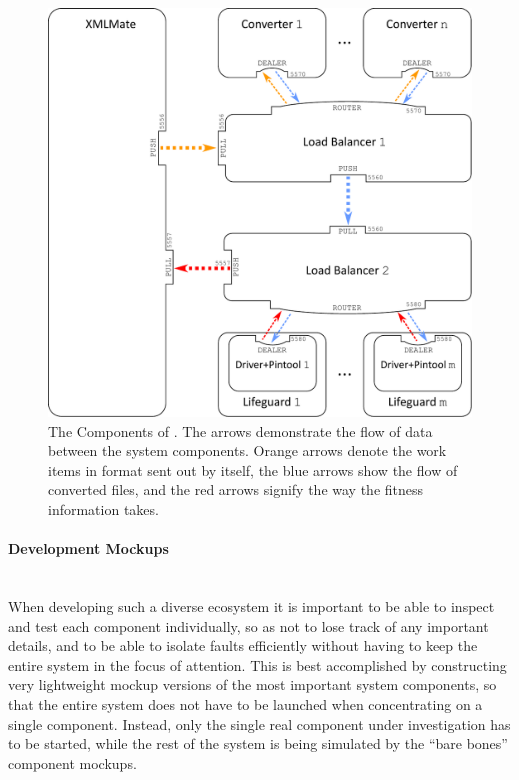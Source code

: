 \begin{figure}[htb]
\centering
  \includegraphics[width=\columnwidth]{system.pdf} 
  \caption{The Components of \xmlmate. 
  The arrows demonstrate the flow of data between the system components. Orange arrows denote the work items
  in \xml format sent out by \xmlmate itself, the blue arrows show the flow of converted files, and the red
  arrows signify the way the fitness information takes.
}
  \label{fig:components}
\end{figure}

\paragraph{Development Mockups} ~\\
When developing such a diverse ecosystem it is important to be able to inspect and test each component
individually, so as not to lose track of any important details, and to be able to isolate faults efficiently
without having to keep the entire system in the focus of attention. 
This is best accomplished by constructing
very lightweight mockup versions of the most important system components, so that the entire system does not
have to be launched when concentrating on a single component. Instead, only the single real component under
investigation has to be started, while the rest of the system is being simulated by the ``bare bones''
component mockups.


